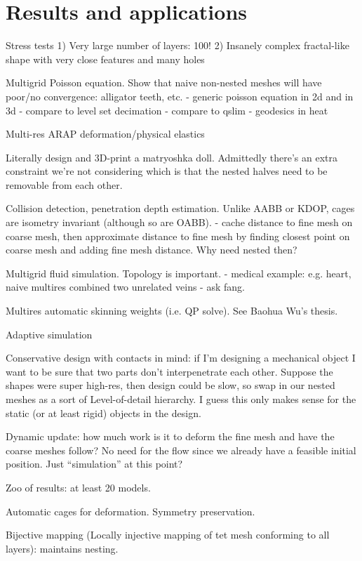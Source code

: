 
\section{Results and applications}
\label{sec:results}

Stress tests
  1) Very large number of layers: 100!
  2) Insanely complex fractal-like shape with very close features and many holes

Multigrid Poisson equation. Show that naive non-nested meshes will have
poor/no convergence: alligator teeth, etc.
  - generic poisson equation in 2d and in 3d
    - compare to level set decimation
    - compare to qslim
  - geodesics in heat 

Multi-res ARAP deformation/physical elastics

Literally design and 3D-print a matryoshka doll. Admittedly there's an extra
constraint we're not considering which is that the nested halves need to be
removable from each other.

Collision detection, penetration depth estimation. Unlike AABB or KDOP, cages
are isometry invariant (although so are OABB).
  - cache distance to fine mesh on coarse mesh, then approximate distance to
    fine mesh by finding closest point on coarse mesh and adding fine mesh
    distance. Why need nested then?

Multigrid fluid simulation. Topology is important.
  - medical example: e.g. heart, naive multires combined two unrelated veins
  - ask fang.

Multires automatic skinning weights (i.e. QP solve). See Baohua Wu's thesis.

Adaptive simulation \cite{Debunne:2001:DRD}

Conservative design with contacts in mind: if I'm designing a mechanical object
I want to be sure that two parts don't interpenetrate each other. Suppose the
shapes were super high-res, then design could be slow, so swap in our nested
meshes as a sort of Level-of-detail hierarchy. I guess this only makes sense
for the static (or at least rigid) objects in the design.

Dynamic update: how much work is it to deform the fine mesh and have the coarse
meshes follow? No need for the flow since we already have a feasible initial
position. Just ``simulation'' at this point?

Zoo of results: at least 20 models.

Automatic cages for deformation. Symmetry preservation.

Bijective mapping (Locally injective mapping of tet mesh conforming to all
layers): maintains nesting.
